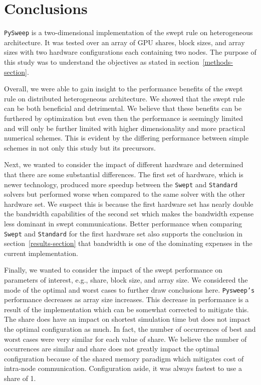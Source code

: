 \documentclass[review]{elsarticle}
\def\pysweep{\texttt{PySweep}}
\def\Swept{\texttt{Swept}}
\def\Standard{\texttt{Standard}}
\begin{document}
\section{Conclusions}
\label{conclusions-section}
\pysweep{} is a two-dimensional implementation of the swept rule on heterogeneous architecture. It was tested over an array of GPU shares, block sizes, and array sizes with two hardware configurations each containing two nodes. The purpose of this study was to understand the objectives as stated in section~\ref{methods-section}.

Overall, we were able to gain insight to the performance benefits of the swept rule on distributed heterogeneous architecture. We showed that the swept rule can be both beneficial and detrimental. We believe that these benefits can be furthered by optimization but even then the performance is seemingly limited and will only be further limited with higher dimensionality and more practical numerical schemes. This is evident by the differing performance between simple schemes in not only this study but its precursors.

Next, we wanted to consider the impact of different hardware and determined that there are some substantial differences. The first set of hardware, which is newer technology, produced more speedup between the \Swept{} and \Standard{} solvers but performed worse when compared to the same solver with the other hardware set. We suspect this is because the first hardware set has nearly double the bandwidth capabilities of the second set which makes the bandwidth expense less dominant in swept communications. Better performance when comparing \Swept{} and \Standard{} for the first hardware set also supports the conclusion in section~\ref{results-section} that bandwidth is one of the dominating expenses in the current implementation.

Finally, we wanted to consider the impact of the swept performance on parameters of interest, e.g., share, block size, and array size. We considered the mode of the optimal and worst cases to further draw conclusions here. \texttt{Pysweep's} performance decreases as array size increases. This decrease in performance is a result of the implementation which can be somewhat corrected to mitigate this. The share does have an impact on shortest simulation time but does not impact the optimal configuration as much. In fact, the number of occurrences of best and worst cases were very similar for each value of share. We believe the number of occurrences are similar and share does not greatly impact the optimal configuration because of the shared memory paradigm which mitigates cost of intra-node communication. 
Configuration aside, it was always fastest to use a share of 1.
\end{document}

